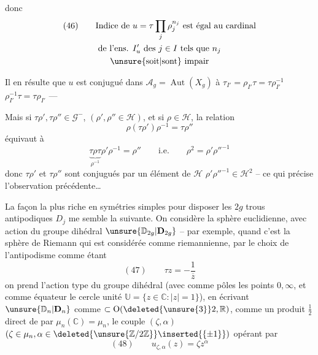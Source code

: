 donc
\[
\begin{gathered}
(46)\qquad \text{Indice de }u=\tau\prod_j\rho_j^{n_j}\text{ est égal au cardinal}\\
\text{de l'ens. }I'_u\text{ des }j\in I\text{ tels que }n_j\\
\text{\unsure{soit|sont} impair}
\end{gathered}
\]

Il en résulte  que $u$ est conjugué dans
$\mathcal A_g=\operatorname{Aut}(X_g)$
à $\tau_{I'}=\rho_{I'}\tau=\tau\rho_{I'}^{-1}$ 
$\rho_{I'}^{-1}\tau=\tau\rho_{I'}$ ---

Mais si $\tau\rho',\tau\rho''\in\mathcal G^-$, $(\rho',\rho''\in\mathcal H)$, et si
$\rho\in\mathcal H$, la relation
\[
\rho(\tau\rho')\rho^{-1}=\tau\rho''
\]
équivaut à
\[
\underbrace{\tau\rho\tau}_{\rho^{-1}}\rho'\rho^{-1}=\rho''
\qquad\text{i.e.}\qquad \rho^2=\rho'\rho''^{-1}
\]
donc $\tau\rho'$ et $\tau\rho''$ sont conjugués par un élément de $\mathcal H$
 $\rho'\rho''^{-1}\in\mathcal H^2$ -- ce qui précise l'observation précédente\ldots

La façon la plus riche en symétries simples pour disposer les $2g$ trous antipodiques
$D_j$ me semble la suivante. On  considère
la sphère euclidienne, avec action du groupe dihédral
$\unsure{\mathbb D_{2g}|\mathbf D_{2g}}$ -- par exemple, quand c'est la sphère de Riemann qui est
considérée comme riemannienne, par le choix de l'antipodisme comme étant
\[
(47)\qquad \tau z=-\frac{1}{\overline z}
\]
on prend l'action type du groupe dihédral (avec comme pôles les points $0,\infty$, et
comme équateur le cercle unité $\mathbb U=\{z\in\mathbb C\mathbin{:}|z|=1\}$),
 en écrivant
$\unsure{\mathbb D_n|\mathbf D_n}$ comme $\subset\operatorname O(\deleted{\unsure{3}}2,\mathbb R)$,
comme un produit $\frac12$ direct de
 par $\mu_n(\mathbb C)=\mu_n$,
le couple $(\zeta,\alpha)$ $(\zeta\in\mu_n,\alpha\in\deleted{\unsure{\mathbb Z/2\mathbb Z}}\inserted{\{\pm1\}})$ opérant par
\[
(48)\qquad u_{\zeta,\alpha}(z)=\zeta z^\alpha
\]

